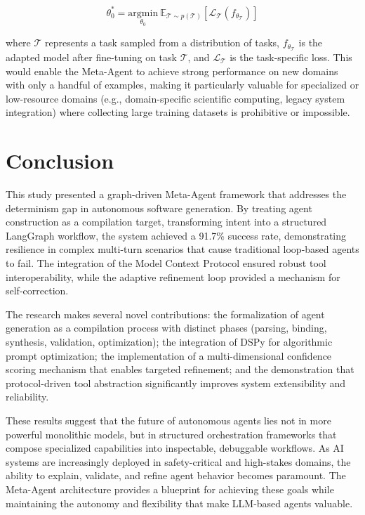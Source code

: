 \documentclass[lettersize,journal]{IEEEtran}
\begin{document}
\begin{equation}
\theta_0^* = \underset{\theta_0}{\text{argmin}} \ \mathbb{E}_{\mathcal{T} \sim p(\mathcal{T})} [\mathcal{L}_{\mathcal{T}}(f_{\theta_{\mathcal{T}}})]
\end{equation}

where $\mathcal{T}$ represents a task sampled from a distribution of tasks, $f_{\theta_{\mathcal{T}}}$ is the adapted model after fine-tuning on task $\mathcal{T}$, and $\mathcal{L}_{\mathcal{T}}$ is the task-specific loss. This would enable the Meta-Agent to achieve strong performance on new domains with only a handful of examples, making it particularly valuable for specialized or low-resource domains (e.g., domain-specific scientific computing, legacy system integration) where collecting large training datasets is prohibitive or impossible.


\section{Conclusion}

This study presented a graph-driven Meta-Agent framework that addresses the determinism gap in autonomous software generation. By treating agent construction as a compilation target, transforming intent into a structured LangGraph workflow, the system achieved a 91.7\% success rate, demonstrating resilience in complex multi-turn scenarios that cause traditional loop-based agents to fail. The integration of the Model Context Protocol ensured robust tool interoperability, while the adaptive refinement loop provided a mechanism for self-correction.

The research makes several novel contributions: the formalization of agent generation as a compilation process with distinct phases (parsing, binding, synthesis, validation, optimization); the integration of DSPy for algorithmic prompt optimization; the implementation of a multi-dimensional confidence scoring mechanism that enables targeted refinement; and the demonstration that protocol-driven tool abstraction significantly improves system extensibility and reliability.

These results suggest that the future of autonomous agents lies not in more powerful monolithic models, but in structured orchestration frameworks that compose specialized capabilities into inspectable, debuggable workflows. As AI systems are increasingly deployed in safety-critical and high-stakes domains, the ability to explain, validate, and refine agent behavior becomes paramount. The Meta-Agent architecture provides a blueprint for achieving these goals while maintaining the autonomy and flexibility that make LLM-based agents valuable.



\end{document}
